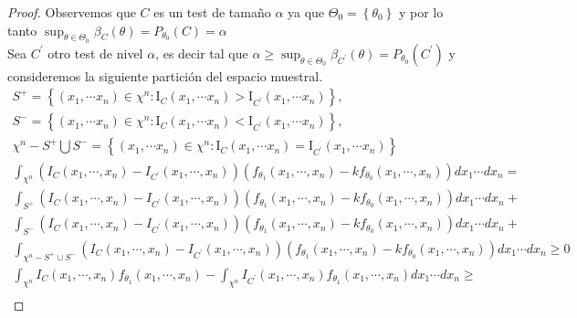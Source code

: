 \begin{proof}
Observemos que $C$ es un test de tamaño $\alpha$ ya que $\Theta_{0}=\left\{\theta_{0}\right\}$ y por lo tanto $\sup _{\theta \in \Theta_{0}} \beta_{C}(\theta)=P_{\theta_{0}}(C)=\alpha$\\
Sea $C^{\prime}$ otro test de nivel $\alpha$, es decir tal que $\alpha \geq \sup _{\theta \in \Theta_{0}} \beta_{C^{\prime}}(\theta)=P_{\theta_{0}}\left(C^{\prime}\right)$ y consideremos la siguiente partición del espacio muestral.
$$
\begin{gathered}
S^{+}=\left\{\left(x_{1}, \cdots x_{n}\right) \in \chi^{n}: \mathrm{I}_{C}\left(x_{1}, \cdots x_{n}\right)>\mathrm{I}_{C^{\prime}}\left(x_{1}, \cdots x_{n}\right)\right\}, \\
S^{-}=\left\{\left(x_{1}, \cdots x_{n}\right) \in \chi^{n}: \mathrm{I}_{C}\left(x_{1}, \cdots x_{n}\right)<\mathrm{I}_{C^{\prime}}\left(x_{1}, \cdots x_{n}\right)\right\}, \\
\chi^{n}-S^{+} \bigcup S^{-}=\left\{\left(x_{1}, \cdots x_{n}\right) \in \chi^{n}: \mathrm{I}_{C}\left(x_{1}, \cdots x_{n}\right)=\mathrm{I}_{C^{\prime}}\left(x_{1}, \cdots x_{n}\right)\right\} \\
\int_{\chi^{n}}\left(I_{C}\left(x_{1}, \cdots, x_{n}\right)-I_{C^{\prime}}\left(x_{1}, \cdots, x_{n}\right)\right)\left(f_{\theta_{1}}\left(x_{1}, \cdots, x_{n}\right)-k f_{\theta_{0}}\left(x_{1}, \cdots, x_{n}\right)\right) d x_{1} \cdots d x_{n}= \\
\int_{S^{+}}\left(I_{C}\left(x_{1}, \cdots, x_{n}\right)-I_{C^{\prime}}\left(x_{1}, \cdots, x_{n}\right)\right)\left(f_{\theta_{1}}\left(x_{1}, \cdots, x_{n}\right)-k f_{\theta_{0}}\left(x_{1}, \cdots, x_{n}\right)\right) d x_{1} \cdots d x_{n}+ \\
\int_{S^{-}}\left(I_{C}\left(x_{1}, \cdots, x_{n}\right)-I_{C^{\prime}}\left(x_{1}, \cdots, x_{n}\right)\right)\left(f_{\theta_{1}}\left(x_{1}, \cdots, x_{n}\right)-k f_{\theta_{0}}\left(x_{1}, \cdots, x_{n}\right)\right) d x_{1} \cdots d x_{n}+ \\
\int_{\chi^{n}-S^{+} \cup S^{-}}\left(I_{C}\left(x_{1}, \cdots, x_{n}\right)-I_{C^{\prime}}\left(x_{1}, \cdots, x_{n}\right)\right)\left(f_{\theta_{1}}\left(x_{1}, \cdots, x_{n}\right)-k f_{\theta_{0}}\left(x_{1}, \cdots, x_{n}\right)\right) d x_{1} \cdots d x_{n} \geq 0 \\
\int_{\chi^{n}} I_{C}\left(x_{1}, \cdots, x_{n}\right) f_{\theta_{1}}\left(x_{1}, \cdots, x_{n}\right)-\int_{\chi^{n}} I_{C^{\prime}}\left(x_{1}, \cdots, x_{n}\right) f_{\theta_{1}}\left(x_{1}, \cdots, x_{n}\right) d x_{1} \cdots d x_{n} \geq \\

\end{gathered}$$
\end{proof}
